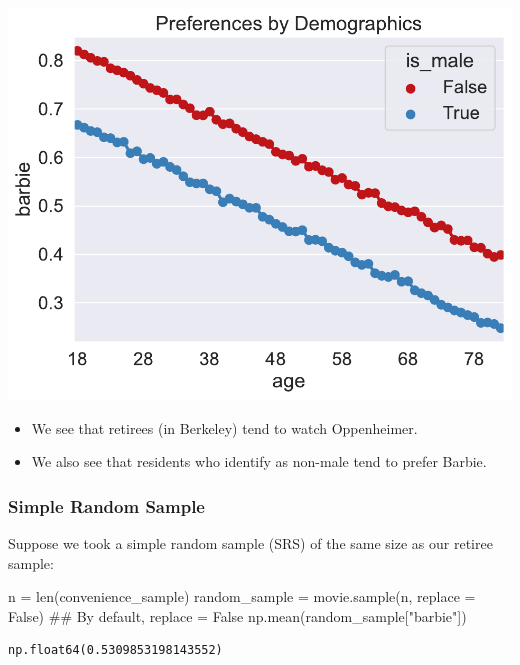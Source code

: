 \documentclass[
  letterpaper,
  DIV=11,
  numbers=noendperiod]{scrreprt}
\newenvironment{Shaded}{\begin{snugshade}}{\end{snugshade}}
\newcommand{\BuiltInTok}[1]{\textcolor[rgb]{0.00,0.23,0.31}{#1}}
\newcommand{\CommentTok}[1]{\textcolor[rgb]{0.37,0.37,0.37}{#1}}
\newcommand{\NormalTok}[1]{\textcolor[rgb]{0.00,0.23,0.31}{#1}}
\newcommand{\OperatorTok}[1]{\textcolor[rgb]{0.37,0.37,0.37}{#1}}
\newcommand{\StringTok}[1]{\textcolor[rgb]{0.13,0.47,0.30}{#1}}
\newcommand{\VariableTok}[1]{\textcolor[rgb]{0.07,0.07,0.07}{#1}}
\providecommand{\tightlist}{%
  \setlength{\itemsep}{0pt}\setlength{\parskip}{0pt}}\usepackage{longtable,booktabs,array}
\begin{document}
\includegraphics{sampling/sampling_files/figure-pdf/cell-9-output-1.pdf}

\begin{itemize}
\tightlist
\item
  We see that retirees (in Berkeley) tend to watch Oppenheimer.
\item
  We also see that residents who identify as non-male tend to prefer
  Barbie.
\end{itemize}

\subsubsection{Simple Random Sample}\label{simple-random-sample}

Suppose we took a simple random sample (SRS) of the same size as our
retiree sample:

\begin{Shaded}
\begin{Highlighting}[]
\NormalTok{n }\OperatorTok{=} \BuiltInTok{len}\NormalTok{(convenience\_sample)}
\NormalTok{random\_sample }\OperatorTok{=}\NormalTok{ movie.sample(n, replace }\OperatorTok{=} \VariableTok{False}\NormalTok{) }\CommentTok{\#\# By default, replace = False}
\NormalTok{np.mean(random\_sample[}\StringTok{"barbie"}\NormalTok{])}
\end{Highlighting}
\end{Shaded}

\begin{verbatim}
np.float64(0.5309853198143552)
\end{verbatim}
\end{document}
